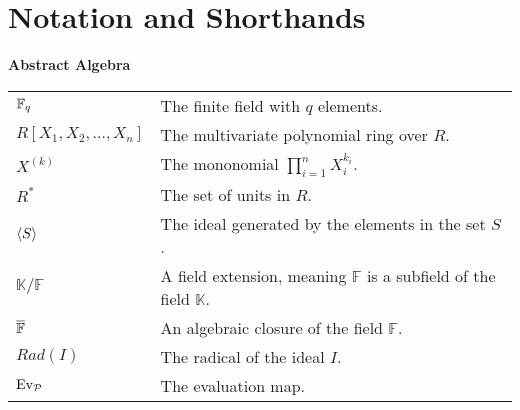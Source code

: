 \chapter*{Notation and Shorthands}
\textbf{Abstract Algebra}

\begin{table}[H]
    \begin{tabular}{ll}
      $\mathbb{F}_{q}$ & The finite field with $q$ elements. \\
      $R[X_1, X_2, \ldots, X_{n}]$ & The multivariate polynomial ring over $R$. \\
      $X^{(k)}$ & The mononomial $\prod_{i = 1}^{n} X_{i}^{k_{i}}$. \\
      $R^{*}$ & The set of units in $R$. \\
      $\langle S\rangle$ & The ideal generated by the elements in the set $S$. \\
      $\mathbb{K}/\mathbb{F}$ & A field extension, meaning $\mathbb{F}$ is a subfield of the field $\mathbb{K}$. \\
      $\overline{\mathbb{F}}$ & An algebraic closure of the field $\mathbb{F}$. \\
      $Rad(I)$ & The radical of the ideal $I$. \\
      $\textnormal{Ev}_\mathcal{P}$ & The evaluation map. \\
    \end{tabular}
\end{table}

